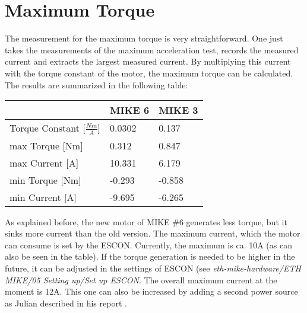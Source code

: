 \section{Maximum Torque}
The measurement for the maximum torque is very straightforward. One just takes the measurements of the maximum acceleration test, records the measured current and extracts the largest measured current. By multiplying this current with the torque constant of the motor, the maximum torque can be calculated. The results are summarized in the following table:

\begin{table}[h]
\centering
\begin{tabular}{|l|l|l|}
\hline
                    & \textbf{MIKE 6} & \textbf{MIKE 3} \\ \hline
Torque Constant {[}$\frac{Nm}{A}${]} & 0.0302           & 0.137           \\ \hline
max Torque {[}Nm{]} & 0.312           & 0.847           \\ \hline
max Current {[}A{]} & 10.331           & 6.179           \\ \hline
min Torque {[}Nm{]} & -0.293           & -0.858          \\ \hline
min Current {[}A{]} & -9.695           & -6.265           \\ \hline
\end{tabular}
\end{table}

As explained before, the new motor of MIKE \#6 generates less torque, but it sinks more current than the old version. The maximum current, which the motor can consume is set by the ESCON. Currently, the maximum is ca. 10A (as can also be seen in the table). If the torque generation is needed to be higher in the future, it can be adjusted in the settings of ESCON (see \emph{eth-mike-hardware/ETH MIKE/05 Setting up/Set up ESCON}. The overall maximum current at the moment is 12A. This one can also be increased by adding a second power source as Julian described in his report \cite{julian}.